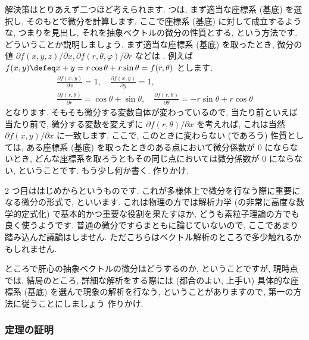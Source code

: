 \documentclass[openany, a4paper, oneside]{jsbook}
\begin{document}
解決策はとりあえず二つほど考えられます.
 つは, まず適当な座標系 (基底) を選択し, そのもとで微分を計算します.
ここで座標系 (基底) に対して成立するような,
つまりを見出し,
それを抽象ベクトルの微分の性質とする, という方法です.
どういうことか説明しましょう.
まず適当な座標系 (基底) を取ったとき, 微分の値
$\partial f (x ,y , z) / \partial x , \partial f (r , \theta, \varphi) / \partial r$ などは
.
例えば $f (x, y) \defeq x + y = r \cos \theta + r \sin \theta = f ( r, \theta)$ とします.
\begin{gather}
 \frac{\partial  f ( x, y )} { \partial  x }
 =
 1, \quad
 \frac{\partial f ( x, y ) } { \partial  y }
 =
 1, \\
 \frac{\partial f (r, \theta )} { \partial r }
 =
 \cos \theta + \sin \theta, \quad
 \frac{\partial f (r, \theta )} { \partial \theta }
 =
 -r \sin \theta + r \cos \theta
\end{gather}
となります.
そもそも微分する変数自体が変わっているので, 当たり前といえば当たり前で,
微分する変数を変えずに $\partial f (r , \theta) / \partial x$ を考えれば, これは当然
 $\partial f ( x , y) / \partial x$ に一致します.
ここで, このときに変わらない (であろう) 性質としては,
ある座標系 (基底) を取ったときのある点において微分係数が $0$ にならないとき,
どんな座標系を取ろうともその同じ点においては微分係数が $0$ にならない, ということです.
もう少し何か書く. 作りかけ.

2 つ目ははじめからというものです.
これが多様体上で微分を行なう際に重要になる微分の形式で,
といいます.
これは物理の方では解析力学 (の非常に高度な数学的定式化) で基本的かつ重要な役割を果たすほか,
どうも素粒子理論の方でも良く使うようです.
普通の微分ですらまともに論じていないので, ここであまり踏み込んだ議論はしません.
ただこちらはベクトル解析のところで多少触れるかもしれません.

ところで肝心の抽象ベクトルの微分はどうするのか, ということですが,
現時点では, 結局のところ, 詳細な解析をする際には
(都合のよい, 上手い) 具体的な座標系 (基底) を選んで現象の解析を行なう,
ということがありますので,
第一の方法に従うことにしましょう
作りかけ.
\subsubsection{定理の証明}
\end{document}
